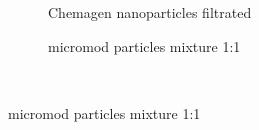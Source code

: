 \begin{figure}[h]
          \begin{subfigure}{0.49\textwidth}
                  \caption{Chemagen nanoparticles filtrated }\label{fig:hist_chemagen}
          \end{subfigure}\hfill	
	  \begin{subfigure}{0.49\textwidth}
                  \caption{micromod particles mixture 1:1}\label{fig:hist_micro_mix}
          \end{subfigure}\hfill	\\

\end{figure}

